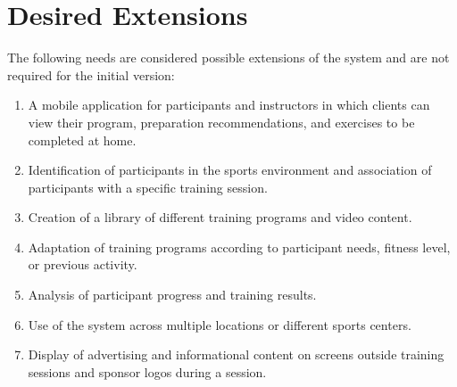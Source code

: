 \documentclass[a4paper,11pt]{article}
\begin{document}
\section{Desired Extensions}
The following needs are considered possible extensions of the system and are not required for the initial version:
\begin{enumerate}[label=\arabic*., start=14]
\item A mobile application for participants and instructors in which clients can view their program, preparation recommendations, and exercises to be completed at home.
\item Identification of participants in the sports environment and association of participants with a specific training session.
\item Creation of a library of different training programs and video content.
\item Adaptation of training programs according to participant needs, fitness level, or previous activity.
\item Analysis of participant progress and training results.
\item Use of the system across multiple locations or different sports centers.
\item Display of advertising and informational content on screens outside training sessions and sponsor logos during a session.
\end{enumerate}
\end{document}

